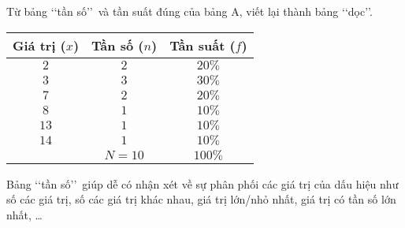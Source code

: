 \begin{ex}%
	Từ bảng \lq\lq tần số\rq\rq\ và tần suất đúng của bảng A, viết lại thành bảng \lq\lq dọc\rq\rq.
	\begin{center}
		\begin{tabular}{|c|c|c|}
			\hline
			Giá trị ($x$) &Tần số ($n$) &Tần suất ($f$)\\
			\hline
			$2$ &$2$ &$20\%$\\
			\hline
			$3$ &$3$ &$30\%$\\
			\hline
			$7$ &$2$ &$20\%$\\
			\hline
			$8$ &$1$ &$10\%$\\
			\hline
			$13$ &$1$ &$10\%$\\
			\hline
			$14$ &$1$ &$10\%$\\
			\hline
			&$N=10$ &$100\%$\\
			\hline
		\end{tabular}
	\end{center}
\end{ex}
\begin{note}
	Bảng \lq\lq tần số\rq\rq\ giúp dễ có nhận xét về sự phân phối các giá trị của dấu hiệu như số các giá trị, số các giá trị khác nhau, giá trị lớn/nhỏ nhất, giá trị có tần số lớn nhất, \ldots
\end{note}

